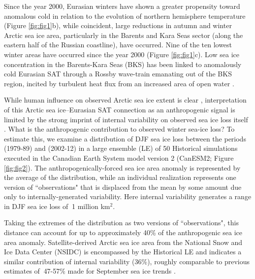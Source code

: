 \documentclass{nature}
\begin{document}
Since the year 2000, Eurasian winters have shown a greater propensity toward anomalous cold in relation to the evolution of northern hemisphere temperature (Figure \ref{fig:fig1}b), while coincident, large reductions in autumn and winter Arctic sea ice area, particularly in the Barents and Kara Seas sector (along the eastern half of the Russian coastline), have occurred. Nine of the ten lowest winter areas have occurred since the year 2000 (Figure \ref{fig:fig1}c). Low sea ice concentration in the Barents-Kara Seas (BKS) has been linked to anomalously cold Eurasian SAT through a Rossby wave-train emanating out of the BKS region, incited by turbulent heat flux from an increased area of open water \cite{honda09,mori14,kim14,peings14}. 

While human influence on observed Arctic sea ice extent is clear \cite{min08}, interpretation of this Arctic sea ice--Eurasian SAT connection as an anthropogenic signal is limited by the strong imprint of internal variability on observed sea ice loss itself \cite{swart15}. What is the anthropogenic contribution to observed winter sea-ice loss? To estimate this, we examine a distribution of DJF sea ice loss between the periods (1979-89) and (2002-12) in a large ensemble (LE) of 50 Historical simulations executed in the Canadian Earth System model version 2 (CanESM2; Figure \ref{fig:fig2}). The anthropogenically-forced sea ice area anomaly is represented by the average of the distribution, while an individual realization represents one version of ``observations" that is displaced from the mean by some amount due only to internally-generated variability. Here internal variability generates a range in DJF sea ice loss of $~$1 million km$^2$.

Taking the extremes of the distribution as two versions of ``observations", this distance can account for up to approximately 40\% of the anthropogenic sea ice area anomaly. Satellite-derived Arctic sea ice area from the National Snow and Ice Data Center (NSIDC) is encompassed by the Historical LE and indicates a similar contribution of internal variability (36\%), roughly comparable to previous estimates of $~$47-57\% made for September sea ice trends \cite{kay11,stroeve07}.

\end{document}
